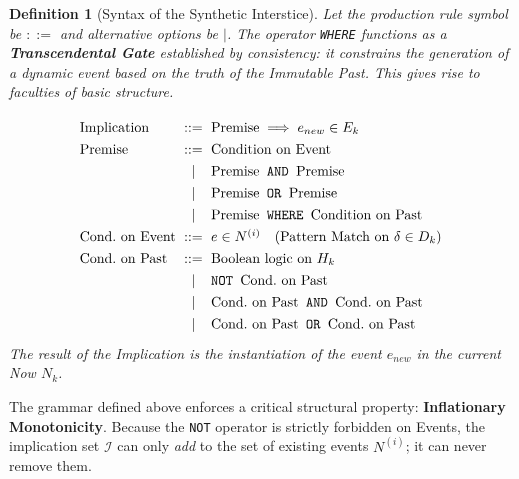 \documentclass[11pt, a4paper]{article}
\theoremstyle{formalism}
\newtheorem{formalism}{Definition}
\begin{document}
\begin{formalism}[Syntax of the Synthetic Interstice]

Let the production rule symbol be $::=$ and alternative options be $\mid$. The
operator \texttt{WHERE} functions as a \textbf{Transcendental Gate}
established by consistency: it constrains the generation of a dynamic
event based on the truth of the Immutable Past. This gives rise to
faculties of basic structure.

\begin{displaymath}
\renewcommand{\arraystretch}{1.3} 
\setlength{\arraycolsep}{3pt}     
\begin{array}{l c l}              
    \text{Implication} & ::= & \text{Premise} \implies e_{new} \in E_k \\
    
    \text{Premise}     & ::= & \text{Condition on Event} \\
                       & \mid & \text{Premise} \textnormal{\texttt{\ AND }} \text{Premise} \\
                       & \mid & \text{Premise} \textnormal{\texttt{\ OR }} \text{Premise} \\
                       & \mid & \text{Premise} \textnormal{\texttt{\ WHERE }} \text{Condition on Past} \\
                       
    \text{Cond.\ on Event}   & ::= & e \in N^{(i)} \quad (\text{Pattern Match on } \delta \in D_k) \\
    
    \text{Cond.\ on Past} & ::= & \text{Boolean logic on } H_k \\
                                & \mid & \textnormal{\texttt{NOT }} \text{Cond.\ on Past} \\
                                & \mid & \text{Cond.\ on Past} \textnormal{\texttt{\ AND }} \text{Cond.\ on Past} \\
                                & \mid & \text{Cond.\ on Past} \textnormal{\texttt{\ OR }} \text{Cond.\ on Past} \\
\end{array}
\end{displaymath}
    The result of the \textit{Implication} is the instantiation of the event $e_{new}$ in the current Now $N_k$.
\end{formalism}

The grammar defined above enforces a critical structural property:
\textbf{Inflationary Monotonicity}. Because the \texttt{NOT} operator is
strictly forbidden on Events, the implication set $\mathcal{I}$ can only
\textit{add} to the set of existing events $N^{(i)}$; it can never remove them.
\end{document}
